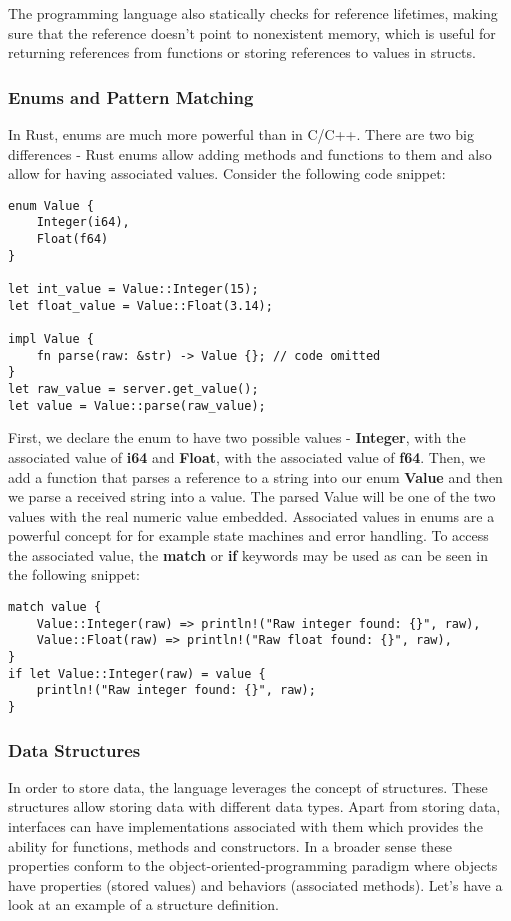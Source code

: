The programming language also statically checks for reference lifetimes, making sure that the reference doesn't point to nonexistent memory, which is useful for returning references from functions or storing references to values in structs.

\subsubsection{Enums and Pattern Matching}
In Rust, enums are much more powerful than in C/C++.
There are two big differences - Rust enums allow adding methods and functions to them and also allow for having associated values.
Consider the following code snippet:

\begin{lstlisting}
enum Value {
    Integer(i64),
    Float(f64)
}

let int_value = Value::Integer(15);
let float_value = Value::Float(3.14);

impl Value {
    fn parse(raw: &str) -> Value {}; // code omitted
}
let raw_value = server.get_value();
let value = Value::parse(raw_value);
\end{lstlisting}

First, we declare the enum to have two possible values - \textbf{Integer}, with the associated value of \textbf{i64} and \textbf{Float}, with the associated value of \textbf{f64}.
Then, we add a function that parses a reference to a string into our enum \textbf{Value} and then we parse a received string into a value.
The parsed Value will be one of the two values with the real numeric value embedded.
Associated values in enums are a powerful concept for for example state machines and error handling.
To access the associated value, the \textbf{match} or \textbf{if} keywords may be used as can be seen in the following snippet:

\begin{lstlisting}
match value {
    Value::Integer(raw) => println!("Raw integer found: {}", raw),
    Value::Float(raw) => println!("Raw float found: {}", raw),
}
if let Value::Integer(raw) = value {
    println!("Raw integer found: {}", raw);
}
\end{lstlisting}

\subsubsection{Data Structures}
In order to store data, the language leverages the concept of structures.
These structures allow storing data with different data types.
Apart from storing data, interfaces can have implementations associated with them which provides the ability for functions, methods and constructors.
In a broader sense these properties conform to the object-oriented-programming paradigm where objects have properties (stored values) and behaviors (associated methods).
Let's have a look at an example of a structure definition.


